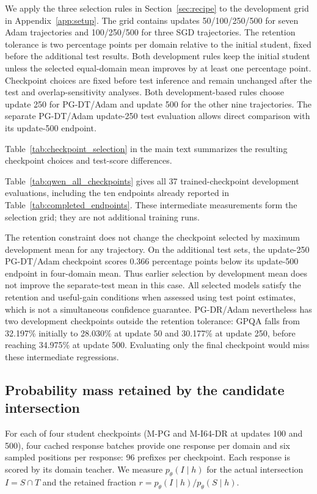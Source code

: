 We apply the three selection rules in Section~\ref{sec:recipe} to the development grid in Appendix~\ref{app:setup}. The grid contains updates 50/100/250/500 for seven Adam trajectories and 100/250/500 for three SGD trajectories. The retention tolerance is two percentage points per domain relative to the initial student, fixed before the additional test results. Both development rules keep the initial student unless the selected equal-domain mean improves by at least one percentage point. Checkpoint choices are fixed before test inference and remain unchanged after the test and overlap-sensitivity analyses. Both development-based rules choose update 250 for PG-DT/Adam and update 500 for the other nine trajectories. The separate PG-DT/Adam update-250 test evaluation allows direct comparison with its update-500 endpoint.

Table~\ref{tab:checkpoint_selection} in the main text summarizes the resulting checkpoint choices and test-score differences.

Table~\ref{tab:qwen_all_checkpoints} gives all 37 trained-checkpoint development evaluations, including the ten endpoints already reported in Table~\ref{tab:completed_endpoints}. These intermediate measurements form the selection grid; they are not additional training runs.


The retention constraint does not change the checkpoint selected by maximum development mean for any trajectory. On the additional test sets, the update-250 PG-DT/Adam checkpoint scores 0.366 percentage points below its update-500 endpoint in four-domain mean. Thus earlier selection by development mean does not improve the separate-test mean in this case. All selected models satisfy the retention and useful-gain conditions when assessed using test point estimates, which is not a simultaneous confidence guarantee. PG-DR/Adam nevertheless has two development checkpoints outside the retention tolerance: GPQA falls from 32.197\% initially to 28.030\% at update 50 and 30.177\% at update 250, before reaching 34.975\% at update 500. Evaluating only the final checkpoint would miss these intermediate regressions.

\subsection{Probability mass retained by the candidate intersection}
\label{app:actual_intersection_coverage}

For each of four student checkpoints (M-PG and M-I64-DR at updates 100 and 500), four cached response batches provide one response per domain and six sampled positions per response: 96 prefixes per checkpoint. Each response is scored by its domain teacher. We measure $p_\theta(I\mid h)$ for the actual intersection $I=S\cap T$ and the retained fraction $r=p_\theta(I\mid h)/p_\theta(S\mid h)$.


